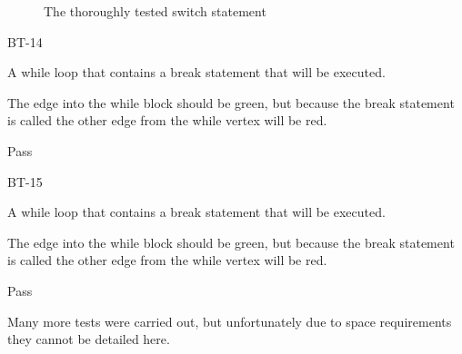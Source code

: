 \begin{figure}
\begin{minipage}{0.19\textwidth}
\end{minipage}
\begin{minipage}{0.19\textwidth}
\end{minipage}
\begin{minipage}{0.19\textwidth}
\end{minipage}
\begin{minipage}{0.19\textwidth}
\end{minipage}
\begin{minipage}{0.19\textwidth}
\end{minipage}
\caption{The thoroughly tested switch statement}
\label{fig:testSwitch}
\end{figure}

\begin{description}[style=sameline,leftmargin=3.5cm,nolistsep]
\item[\hspace*{0.3cm}Label] BT-14
\item[\hspace*{0.3cm}Description] A while loop that contains a break statement that will be executed.
\item[\hspace*{0.3cm}Expected Output] The edge into the while block should be green, but because the break statement is called the other edge from the while vertex will be red.
\item[\hspace*{0.3cm}Result] Pass
\end{description}

\begin{samepage}
\begin{description}[style=sameline,leftmargin=3.5cm,nolistsep]
\item[\hspace*{0.3cm}Label] BT-15
\item[\hspace*{0.3cm}Description] A while loop that contains a break statement that will be executed.
\item[\hspace*{0.3cm}Expected Output] The edge into the while block should be green, but because the break statement is called the other edge from the while vertex will be red.
\item[\hspace*{0.3cm}Result] Pass
\end{description}
\end{samepage}

Many more tests were carried out, but unfortunately due to space requirements they cannot be detailed here.